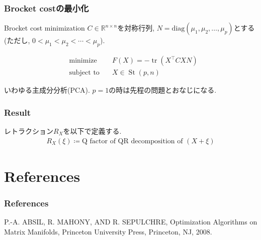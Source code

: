 \documentclass[dvipdfmx,11pt]{beamer}		%
\makeatletter
\newcommand{\R}{\mathbb{R}}
\newcounter{mpproblem}[section]
\newenvironment{mpproblem}[1]%
{%
    \protected@edef\@currentlabelname{#1}%
    \par\vspace{\baselineskip}\noindent%
    \ifx#1\empty %
    \else \refstepcounter{mpproblem}$($#1$)$ %
    \fi%
    \hfill%
    $\left|%
    \hfill%
    \hspace{0.00\textwidth}%
    \@fleqntrue\@mathmargin\parindent%
    \begin{minipage}{0.86\textwidth}%
    \vspace{-1.0\baselineskip}%
}%
{%
    \end{minipage}%
    \@fleqnfalse%
    \right.$%
    \par\vspace{\baselineskip}\noindent%
    \ignorespacesafterend%
}%
\newenvironment{mpproblem*}%
{%
    \begin{mpproblem}{}%
}%
{%
    \end{mpproblem}%
    \ignorespacesafterend%
}
\makeatother
\begin{document}
    \begin{frame}
        \frametitle{Brocket costの最小化}
        \begin{block}{Brocket cost minimization}
            $C\in\R^{n\times n}$を対称行列, $N = \mathrm{diag}(\mu_1, \mu_2, \ldots, \mu_p)$とする(ただし, $0 < \mu_1 <\mu_2 < \cdots < \mu_p$). 
            \begin{mpproblem*}
                \begin{alignat*}{2}
                    &\text{minimize}   & \quad F(X) = - \operatorname{tr}(X^{\top}CXN)\\
                    &\text{subject to} & \quad X\in\operatorname{St}(p, n)   
                \end{alignat*}
            \end{mpproblem*}
        \end{block}
        いわゆる主成分分析(PCA). $p = 1$の時は先程の問題とおなじになる.
    \end{frame}

    \begin{frame}
        \frametitle{Result}
        レトラクション$R_X$を以下で定義する.
        \begin{align*}
            R_X(\xi) \coloneqq \text{Q factor of QR decomposition of } (X + \xi)
        \end{align*}
    \end{frame}

    \section*{References}
    \begin{frame}\frametitle{References}
        \begin{thebibliography}{9}
            \beamertemplatetextbibitems
             P.-A. ABSIL, R. MAHONY, AND R. SEPULCHRE, Optimization Algorithms on Matrix Manifolds, 
                       Princeton University Press, Princeton, NJ, 2008.
	    \end{thebibliography}
    \end{frame}
\end{document}
